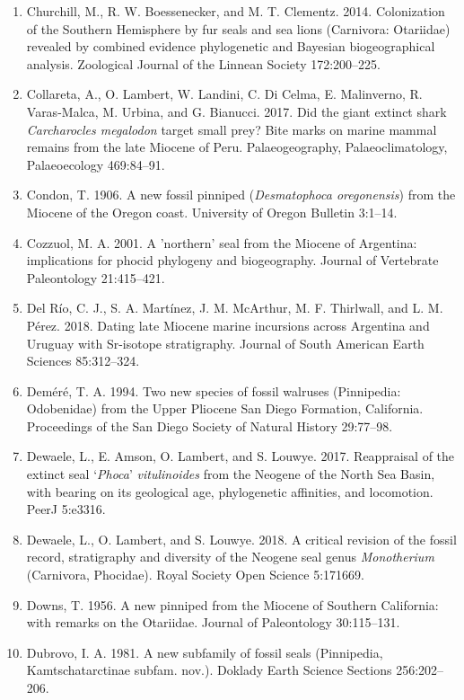 \documentclass[a4paper, 12pt]{article}
\begin{document}
\begin{enumerate}
\item Churchill, M., R. W. Boessenecker, and M. T. Clementz. 2014. Colonization of the Southern Hemisphere by fur seals and sea lions (Carnivora: Otariidae) revealed by combined evidence phylogenetic and Bayesian biogeographical analysis. Zoological Journal of the Linnean Society 172:200–225.
\item Collareta, A., O. Lambert, W. Landini, C. Di Celma, E. Malinverno, R. Varas-Malca, M. Urbina, and G. Bianucci. 2017. Did the giant extinct shark \textit{Carcharocles megalodon} target small prey? Bite marks on marine mammal remains from the late Miocene of Peru. Palaeogeography, Palaeoclimatology, Palaeoecology 469:84–91.
\item Condon, T. 1906. A new fossil pinniped (\textit{Desmatophoca oregonensis}) from the Miocene of the Oregon coast. University of Oregon Bulletin 3:1–14.
\item Cozzuol, M. A. 2001. A 'northern' seal from the Miocene of Argentina: implications for phocid phylogeny and biogeography. Journal of Vertebrate Paleontology 21:415–421.
\item Del R\'{i}o, C. J., S. A. Mart\'{i}nez, J. M. McArthur, M. F. Thirlwall, and L. M. P\'{e}rez. 2018. Dating late Miocene marine incursions across Argentina and Uruguay with Sr-isotope stratigraphy. Journal of South American Earth Sciences 85:312–324.
\item Dem\'{e}r\'{e}, T. A. 1994. Two new species of fossil walruses (Pinnipedia: Odobenidae) from the Upper Pliocene San Diego Formation, California. Proceedings of the San Diego Society of Natural History 29:77–98.
\item Dewaele, L., E. Amson, O. Lambert, and S. Louwye. 2017. Reappraisal of the extinct seal `\textit{Phoca}' \textit{vitulinoides} from the Neogene of the North Sea Basin, with bearing on its geological age, phylogenetic affinities, and locomotion. PeerJ 5:e3316.
\item Dewaele, L., O. Lambert, and S. Louwye. 2018. A critical revision of the fossil record, stratigraphy and diversity of the Neogene seal genus \textit{Monotherium} (Carnivora, Phocidae). Royal Society Open Science 5:171669.
\item Downs, T. 1956. A new pinniped from the Miocene of Southern California: with remarks on the Otariidae. Journal of Paleontology 30:115–131.
\item Dubrovo, I. A. 1981. A new subfamily of fossil seals (Pinnipedia, Kamtschatarctinae subfam. nov.). Doklady Earth Science Sections 256:202–206.

\end{enumerate}
\end{document}
